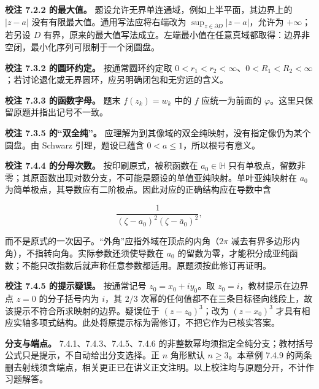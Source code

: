 \documentclass[11pt,a4paper]{article}
\begin{document}
\textbf{校注 7.2.2 的最大值。}
题设允许无界单连通域，例如上半平面，其边界上的 \(|z-a|\)
没有有限最大值。通用写法应将右端改为
\(\sup_{z\in\partial D}|z-a|\)，允许为 \(+\infty\)；若另设 \(D\)
有界，原来的最大值写法成立。左端最小值在任意真域都取得：边界非空闭，最小化序列可限制于一个闭圆盘。

\textbf{校注 7.3.2 的圆环约定。} 按通常圆环约定取
\(0<r_1<r_2<\infty\)、\(0<R_1<R_2<\infty\)；若讨论退化或无界圆环，应另明确闭包和无穷远的含义。

\textbf{校注 7.3.3 的函数字母。} 题末 \(f(z_k)=w_k\) 中的 \(f\)
应统一为前面的 \(\varphi\)。这里只保留原题并指出记号不一致。

\textbf{校注 7.3.5 的``双全纯''。}
应理解为到其像域的双全纯映射，没有指定像仍为某个圆盘。由 Schwarz
引理，题设已蕴含 \(0<a\le1\)，所以根号有意义。

\textbf{校注 7.4.4 的分母次数。} 按印刷原式，被积函数在
\(a_0\in\mathbb H\)
只有单极点，留数非零；其原函数出现对数分支，不可能是题设的单值亚纯映射。单叶亚纯映射在
\(a_0\) 为简单极点，其导数应有二阶极点。因此对应的正确结构应在导数中含

\[
\frac1{(\zeta-a_0)^2(\zeta-\bar a_0)^2},
\]

而不是原式的一次因子。``外角''应指外域在顶点的内角（\(2\pi\)
减去有界多边形内角），不指转向角。实际参数还须使导数在 \(a_0\)
的留数为零，才能积分成亚纯函数；不能只改指数后就声称任意参数都适用。原题须按此修订再证明。

\textbf{校注 7.4.5 的提示疑误。} 按通常记号 \(z_0=x_0+iy_0\)。取
\(z_0=i\)，教材提示在边界点 \(z=0\) 的分子括号内为 \(i\)，其 \(2/3\)
次幂的任何值都不在三条目标径向线段上，故该提示不符合所求映射的边界。疑误位于
\((z-z_0)^3\)；改为 \((z-x_0)^3\)
才具有相应实轴多项式结构。此处将原提示标为需修订，不把它作为已核实答案。

\textbf{分支与端点。} 7.4.1、7.4.3、7.4.5、7.4.6
的非整数幂均须指定全纯分支；教材括号公式只是提示，不自动给出分支选择。正
\(n\) 角形默认 \(n\ge3\)。本章例 7.4.9
的两条删去射线须含端点，相关更正已在讲义正文注明。以上校注均与原题分开，不计作习题解答。
\end{document}
